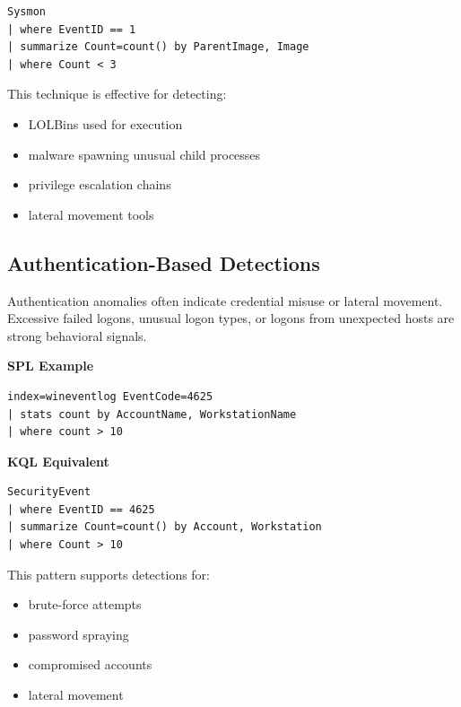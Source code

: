 \begin{lstlisting}
Sysmon
| where EventID == 1
| summarize Count=count() by ParentImage, Image
| where Count < 3
\end{lstlisting}

This technique is effective for detecting:

\begin{itemize}
    \item LOLBins used for execution
    \item malware spawning unusual child processes
    \item privilege escalation chains
    \item lateral movement tools
\end{itemize}


\subsection*{Authentication-Based Detections}

Authentication anomalies often indicate credential misuse or lateral movement. Excessive failed logons, unusual logon types, 
or logons from unexpected hosts are strong behavioral signals.

\textbf{SPL Example}

\begin{lstlisting}
index=wineventlog EventCode=4625
| stats count by AccountName, WorkstationName
| where count > 10
\end{lstlisting}

\textbf{KQL Equivalent}

\begin{lstlisting}
SecurityEvent
| where EventID == 4625
| summarize Count=count() by Account, Workstation
| where Count > 10
\end{lstlisting}

This pattern supports detections for:

\begin{itemize}
    \item brute-force attempts
    \item password spraying
    \item compromised accounts
    \item lateral movement
\end{itemize}


